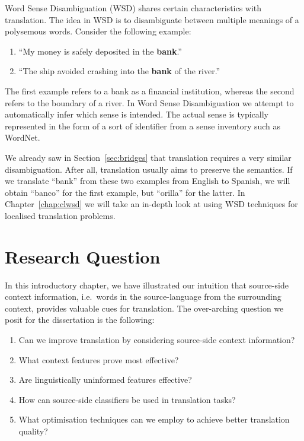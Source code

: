 Word Sense Disambiguation (WSD) shares certain characteristics with
translation. The idea in WSD is to disambiguate between multiple meanings of a
polysemous words. Consider the following example: 

\begin{enumerate}
\item ``My money is safely deposited in the \textbf{bank}.''
\item ``The ship avoided crashing into the \textbf{bank} of the river.''
\end{enumerate}

The first example refers to a bank as a financial institution, whereas the
second refers to the boundary of a river. In Word Sense Disambiguation we
attempt to automatically infer which sense is intended. The actual sense is
typically represented in the form of a sort of identifier from a sense inventory
such as WordNet.

We already saw in Section~\ref{sec:bridges} that translation requires a very
similar disambiguation. After all, translation usually aims to preserve the
semantics. If we translate ``bank'' from these two examples from English to
Spanish, we will obtain ``banco'' for the first example, but ``orilla'' for the
latter. In Chapter~\ref{chap:clwsd} we will take an in-depth look at using
WSD techniques for localised translation problems.

\section{Research Question}
\label{sec:overallresearchquestion}

In this introductory chapter, we have illustrated our intuition that
source-side context information, i.e.\ words in the source-language from the
surrounding context, provides valuable cues for translation. The over-arching
question we posit for the dissertation is the following:

\begin{enumerate}
\item Can we improve translation by considering source-side context information? 
\item What context features prove most effective?
\item Are linguistically uninformed features effective?
\item How can source-side classifiers be used in translation tasks?
\item What optimisation techniques can we employ to achieve better translation quality?
\end{enumerate}

